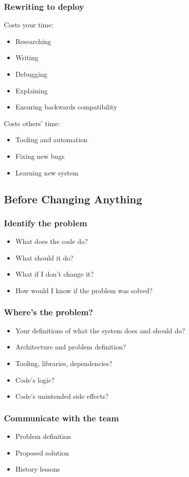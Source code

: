 \documentclass{beamer}
\begin{document}
\begin{frame}[fragile]
\frametitle{Rewriting to deploy}
Costs your time:
\begin{itemize}
\item Researching
\item Writing
\item Debugging
\item Explaining
\item Ensuring backwards compatibility
\end{itemize}
Costs others' time:
\begin{itemize}
\item Tooling and automation
\item Fixing new bugs
\item Learning new system
\end{itemize}
\end{frame}


\subsection{Before Changing Anything}
\begin{frame}[fragile]
\frametitle{Identify the problem}
\begin{itemize}
\item What does the code do?
\item What should it do?
\item What if I don't change it?
\item How would I know if the problem was solved?
\end{itemize}
\end{frame}

\begin{frame}[fragile]
\frametitle{Where's the problem?}
\begin{itemize}
\item Your definitions of what the system does and should do?
\item Architecture and problem definition?
\item Tooling, libraries, dependencies?
\item Code's logic?
\item Code's unintended side effects?
\end{itemize}
\end{frame}

\begin{frame}[fragile]
\frametitle{Communicate with the team}
\begin{itemize}
\item Problem definition
\item Proposed solution
\item History lessons
\end{itemize}
\end{frame}
\end{document}

